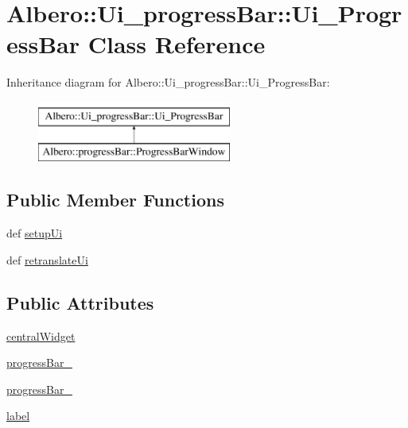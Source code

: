 \hypertarget{classAlbero_1_1Ui__progressBar_1_1Ui__ProgressBar}{
\section{Albero::Ui\_\-progressBar::Ui\_\-ProgressBar Class Reference}
\label{classAlbero_1_1Ui__progressBar_1_1Ui__ProgressBar}
}
Inheritance diagram for Albero::Ui\_\-progressBar::Ui\_\-ProgressBar:\begin{figure}[H]
\begin{center}
\leavevmode
\includegraphics[height=2.000000cm]{classAlbero_1_1Ui__progressBar_1_1Ui__ProgressBar}
\end{center}
\end{figure}
\subsection*{Public Member Functions}
\begin{DoxyCompactItemize}
\item 
def \hyperlink{classAlbero_1_1Ui__progressBar_1_1Ui__ProgressBar_a2fa0d3916553a839da9a5dcbfbbf587e}{setupUi}
\item 
def \hyperlink{classAlbero_1_1Ui__progressBar_1_1Ui__ProgressBar_a2c4c427104a9284088672b9df988f4c3}{retranslateUi}
\end{DoxyCompactItemize}
\subsection*{Public Attributes}
\begin{DoxyCompactItemize}
\item 
\hyperlink{classAlbero_1_1Ui__progressBar_1_1Ui__ProgressBar_a75e51d6dc55f4263cc9b85cbf3fc84f0}{centralWidget}
\item 
\hyperlink{classAlbero_1_1Ui__progressBar_1_1Ui__ProgressBar_a43d1090e7cb0353d6c4ef8d0d9823a90}{progressBar\_}
\item 
\hyperlink{classAlbero_1_1Ui__progressBar_1_1Ui__ProgressBar_a9f124a9a2346cc212cc9c93cb1396cf7}{progressBar\_}
\item 
\hyperlink{classAlbero_1_1Ui__progressBar_1_1Ui__ProgressBar_a3b6f83cb44246f397dee3d4c2e58211e}{label}
\end{DoxyCompactItemize}


